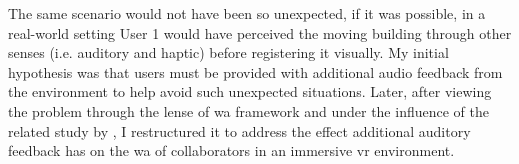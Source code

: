 The same scenario would not have been so unexpected, if it was possible, in a real-world setting \textemdash User 1 would have perceived the moving building through other senses (i.e. auditory and haptic) before registering it visually. 
My initial hypothesis was that users must be provided with additional audio feedback from the environment to help avoid such unexpected situations. Later, after viewing the problem through the lense of \gls{wa} framework and under the influence of the related study by \cite{gutwin_chalk_2011},  I restructured it to address the effect additional auditory feedback has on the \gls{wa} of collaborators in an immersive \gls{vr} environment.

 


